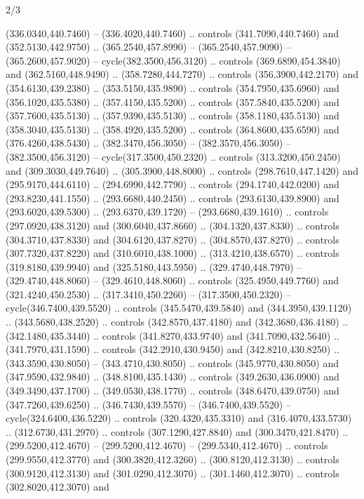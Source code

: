 \begin{flagdescription}{2/3}
\begin{scope}[xshift=0.5\flaglength]
\begin{scope}[scale=0.00209\flagwidth,yshift=170mm,xshift=-360]
\begin{scope}[y=-0.8pt, x=0.8pt, inner sep=0pt, outer sep=0pt]
\begin{scope}[cm={{-1.0,0.0,0.0,1.0,(900.0,0.0)}}]
  (336.0340,440.7460) -- (336.4020,440.7460) .. controls (341.7090,440.7460) and
  (352.5130,442.9750) .. (365.2540,457.8990) -- (365.2540,457.9090) --
  (365.2600,457.9020) -- cycle(382.3500,456.3120) .. controls
  (369.6890,454.3840) and (362.5160,448.9490) .. (358.7280,444.7270) .. controls
  (356.3900,442.2170) and (354.6130,439.2380) .. (353.5150,435.9890) .. controls
  (354.7950,435.6960) and (356.1020,435.5380) .. (357.4150,435.5200) .. controls
  (357.5840,435.5200) and (357.7600,435.5130) .. (357.9390,435.5130) .. controls
  (358.1180,435.5130) and (358.3040,435.5130) .. (358.4920,435.5200) .. controls
  (364.8600,435.6590) and (376.4260,438.5430) .. (382.3470,456.3050) --
  (382.3570,456.3050) -- (382.3500,456.3120) -- cycle(317.3500,450.2320) ..
  controls (313.3200,450.2450) and (309.3030,449.7640) .. (305.3900,448.8000) ..
  controls (298.7610,447.1420) and (295.9170,444.6110) .. (294.6990,442.7790) ..
  controls (294.1740,442.0200) and (293.8230,441.1550) .. (293.6680,440.2450) ..
  controls (293.6130,439.8900) and (293.6020,439.5300) .. (293.6370,439.1720) --
  (293.6680,439.1610) .. controls (297.0920,438.3120) and (300.6040,437.8660) ..
  (304.1320,437.8330) .. controls (304.3710,437.8330) and (304.6120,437.8270) ..
  (304.8570,437.8270) .. controls (307.7320,437.8220) and (310.6010,438.1000) ..
  (313.4210,438.6570) .. controls (319.8180,439.9940) and (325.5180,443.5950) ..
  (329.4740,448.7970) -- (329.4740,448.8060) -- (329.4610,448.8060) .. controls
  (325.4950,449.7760) and (321.4240,450.2530) .. (317.3410,450.2260) --
  (317.3500,450.2320) -- cycle(346.7400,439.5520) .. controls
  (345.5470,439.5840) and (344.3950,439.1120) .. (343.5680,438.2520) .. controls
  (342.8570,437.4180) and (342.3680,436.4180) .. (342.1480,435.3440) .. controls
  (341.8270,433.9740) and (341.7090,432.5640) .. (341.7970,431.1590) .. controls
  (342.2910,430.9450) and (342.8210,430.8250) .. (343.3590,430.8050) --
  (343.4710,430.8050) .. controls (345.9770,430.8050) and (347.9590,432.9840) ..
  (348.8100,435.1430) .. controls (349.2630,436.0900) and (349.3490,437.1700) ..
  (349.0530,438.1770) .. controls (348.6470,439.0750) and (347.7260,439.6250) ..
  (346.7430,439.5570) -- (346.7400,439.5520) -- cycle(324.6400,436.5220) ..
  controls (320.4320,435.3310) and (316.4070,433.5730) .. (312.6730,431.2970) ..
  controls (307.1290,427.8840) and (300.3470,421.8470) .. (299.5200,412.4670) --
  (299.5200,412.4670) -- (299.5340,412.4670) .. controls (299.9550,412.3770) and
  (300.3820,412.3260) .. (300.8120,412.3130) .. controls (300.9120,412.3130) and
  (301.0290,412.3070) .. (301.1460,412.3070) .. controls (302.8020,412.3070) and

\end{scope}
\end{scope}
\end{scope}
\end{scope}
\end{flagdescription}
